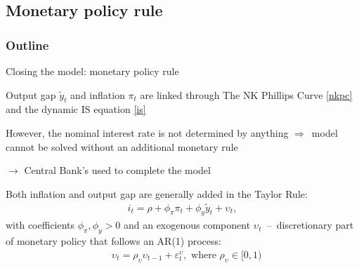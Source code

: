 \documentclass{beamer}
\newcommand{\tb}[1]{{\color{blue}{\textbf{#1}}}}
\newenvironment{mytemize}
{\vfill\itemize[nolistsep,itemsep=\fill,label=\color{blue}{$\triangleright$}]}
  {\enditemize}
\newcommand{\rarr}{$\Rightarrow$\ }
\begin{document}
\subsection{Monetary policy rule}
\begin{frame}
\frametitle{Outline}
\tableofcontents[currentsubsection]
\end{frame}
\begin{frame}{Closing the model: monetary policy rule}

\begin{mytemize}
\item Output gap $\tilde y_t$ and inflation $\pi_t$ are linked through The NK Phillips Curve \eqref{nkpc} and the dynamic IS equation \eqref{is}
\item However, the \alert{nominal interest rate is not determined by anything} \rarr model cannot be solved without an additional monetary rule
\item[$\rightarrow$] Central Bank's \tb{Taylor Rule} used to complete the model
\item Both inflation and output gap are generally added in the Taylor Rule:
\begin{align*}
i_t = \rho + \phi_{\pi} \pi_t + \phi_y \tilde{y}_t + \upsilon_t, 
\end{align*}
with coefficients $\phi_{\pi},\phi_{y}>0$ and an exogenous component $\upsilon_{t}$~--~discretionary part of monetary policy that follows an AR(1) process:
\begin{align*}
& \upsilon_t = \rho_{\upsilon}\upsilon_{t-1}+ \varepsilon^{\upsilon}_t, \text{ where } \rho_{\upsilon} \in [0,1)
\end{align*}
\end{mytemize}

\end{frame}
\end{document}
